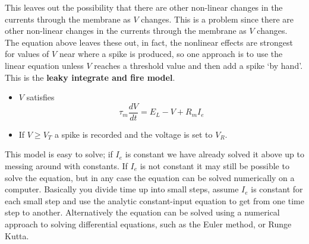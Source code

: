 \documentclass[11pt,a4paper]{scrartcl}
\begin{document}
This leaves out the possibility that there are other non-linear
changes in the currents through the membrane as $V$ changes. This is a
problem since there are other non-linear changes in the currents
through the membrane as $V$ changes. The equation above leaves these
out, in fact, the nonlinear effects are strongest for values of $V$
near where a spike is produced, so one approach is to use the linear
equation unless $V$ reaches a threshold value and then add a spike \lq{}by
hand\rq{}. This is the \textbf{leaky integrate and fire model}.

\begin{itemize}
\item $V$ satisfies
\begin{equation}
\tau_m\frac{dV}{dt}=E_L-V+R_mI_e
\end{equation}
\item If $V\ge V_T$ a spike is recorded and the voltage is set to $V_R$.
\end{itemize}

This model is easy to solve; if $I_e$ is constant we have already
solved it above up to messing around with constants. If $I_e$ is not
constant it may still be possible to solve the equation, but in any
case the equation can be solved numerically on a computer. Basically
you divide time up into small steps, assume $I_e$ is constant for each
small step and use the analytic constant-input equation to get from
one time step to another. Alternatively the equation can be solved
using a numerical approach to solving differential equations, such as
the Euler method, or Runge Kutta.
\end{document}
